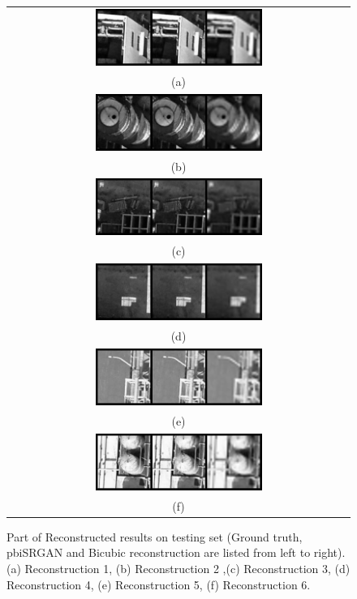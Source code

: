 \documentclass[10pt,twocolumn,letterpaper]{article}
\begin{document}
\begin{figure}%
\centering\begin{tabular}{c}
\includegraphics[width=0.5\textwidth]{fig25-a}\\
(a)\\%
\includegraphics[width=0.5\textwidth]{fig25-b}\\
(b)\\
\includegraphics[width=0.5\textwidth]{fig25-c}\\
(c)\\
\includegraphics[width=0.5\textwidth]{fig25-d}\\
(d)\\
\includegraphics[width=0.5\textwidth]{fig25-e}\\
(e)\\
\includegraphics[width=0.5\textwidth]{fig25-f}\\
(f)
\end{tabular}
\caption{Part of Reconstructed results on testing set (Ground truth, pbiSRGAN and Bicubic reconstruction are listed from left to right). (a) Reconstruction 1, (b) Reconstruction 2 ,(c) Reconstruction 3, (d) Reconstruction 4, (e) Reconstruction 5, (f) Reconstruction 6.}%
\label{fig25}%
\end{figure}
\end{document}
